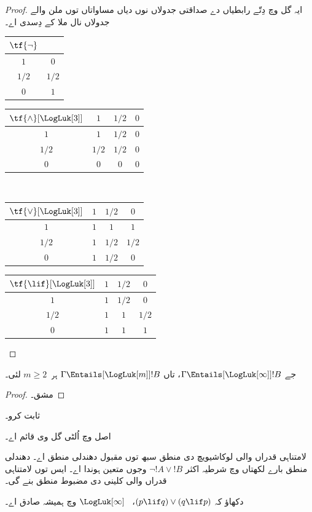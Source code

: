 \documentclass[../../../include/open-logic-section]{subfiles}
\begin{document}
\begin{proof}
  ایہ گل  وچ دِتّے رابطیاں دے
  صداقتی جدولاں نوں  دیاں مساواتاں توں
  ملن والے جدولاں نال ملا کے دِسدی اے۔
  \begin{center}
    \begin{tabular}{c|c} 
      $\tf{\lnot}$ & \\ 
      \hline  
      $1$ & $0$ \\ 
      $1/2$ & $1/2$ \\
      $0$ & $1$ 
    \end{tabular}
    \quad
    \begin{tabular}{c|ccc} 
      $\tf{\land}[\LogLuk[3]]$ & $1$ & $1/2$ & $0$ \\ 
      \hline 
      $1$ & $1$ & $1/2$ & $0$ \\ 
      $1/2$ & $1/2$ & $1/2$ & $0$\\ 
      $0$ & $0$ & $0$ & $0$ 
    \end{tabular}
    \\[2ex]
    \begin{tabular}{c|ccc} 
      $\tf{\lor}[\LogLuk[3]]$ & $1$ & $1/2$ & $0$ \\ 
      \hline 
      $1$ & $1$ & $1$ & $1$ \\ 
      $1/2$ & $1$ & $1/2$ & $1/2$ \\
      $0$ & $1$ & $1/2$ & $0$ 
    \end{tabular}
    \quad
    \begin{tabular}{c|ccc} 
      $\tf{\lif}[\LogLuk[3]]$ & $1$ & $1/2$ & $0$ \\ 
      \hline 
      $1$ & $1$ & $1/2$ & $0$ \\ 
      $1/2$ & $1$ & $1$ & $1/2$  \\ 
      $0$ & $1$ & $1$ & $1$ 
    \end{tabular}
  \end{center}
\end{proof}

\begin{prop}
  جے $\Gamma \Entails[\LogLuk[\infty]] !B$، تاں $\Gamma
  \Entails[\LogLuk[m]] !B$ ہر~$m \ge 2$ لئی۔
\end{prop}

\begin{proof}
  مشق۔
\end{proof}

\begin{prob}
   ثابت کرو۔
\end{prob}

اصل وچ اُلٹی گل وی قائم اے۔

لامتناہی قدراں والی لوکاشیویچ دی منطق سبھ توں مقبول دھندلی
منطق اے۔ دھندلی منطق بارے لکھتاں وچ شرطیہ اکثر $\lnot !A \lor !B$
وجوں متعین ہوندا اے۔ ایس توں لامتناہی قدراں والی کلینی دی مضبوط منطق
بنے گی۔

\begin{prob}
  دکھاؤ کہ $(p \lif q) \lor (q \lif p)$، ~$\LogLuk[\infty]$
  وچ ہمیشہ صادق اے۔
\end{prob}
\end{document}
